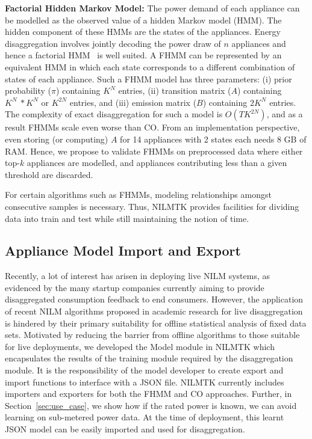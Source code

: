 \documentclass{sig-alternate}
\newcommand{\redcolor}[1]{\textcolor{red}{#1}}
\newcommand{\secref}[1]{Section~\ref{#1}}
\begin{document}
\textbf{Factorial Hidden Markov Model:} The power demand of each appliance can be modelled as the observed value of a hidden Markov model (HMM). The hidden component of these HMMs are the states of the appliances. Energy disaggregation involves jointly decoding the power draw of $n$ appliances and hence a factorial HMM~\cite{fhmm} is well suited. A FHMM can be represented by an equivalent HMM in which each state corresponds to a different combination of states of each appliance. Such a FHMM model has three parameters: (i) prior probability ($\pi$) containing $K^N$ entries, (ii) transition matrix ($A$) containing $K^N~*K^N$ or $K^{2N}$ entries, and (iii) emission matrix ($B$) containing $2K^N$ entries. The complexity of exact disaggregation for such a model is $O(TK^{2N})$, and as a result FHMMs scale even worse than CO. From an implementation perspective, even storing (or computing) $A$ for 14 appliances with 2 states each needs 8 GB of RAM. Hence, we propose to validate FHMMs on preprocessed data where either top-$k$ appliances are modelled, and appliances contributing less than a given threshold are discarded.

For certain algorithms such as FHMMs, modeling relationships amongst consecutive samples is necessary. Thus, NILMTK provides facilities for dividing data into train and test while still maintaining the notion of time.

\subsection{Appliance Model Import and Export}


\noindent
Recently, a lot of interest has arisen in deploying live NILM systems, as evidenced by the many startup companies currently aiming to provide disaggregated consumption feedback to end consumers. However, the application of recent NILM algorithms proposed in academic research for live disaggregation is hindered by their primary suitability for offline statistical analysis of fixed data sets. Motivated by reducing the barrier from offline algorithms to those suitable for live deployments, we developed the Model module in NILMTK which encapsulates the results of the training module required by the disaggregation module. It is the responsibility of the model developer to create export and import functions to interface with a JSON file. NILMTK currently includes importers and exporters for both the FHMM and CO approaches. Further, in \secref{sec:use_case}, we show how if the rated power is known, we can avoid learning on sub-metered power data. At the time of deployment, this learnt JSON model can be easily imported and used for disaggregation.
\end{document}

